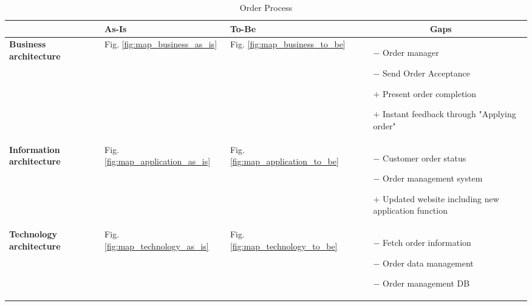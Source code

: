 \begin{table}[H]
	\centering
	\begin{tabular}{|p{2.4cm}|l|l|p{7.5cm}|}
		\hline
		\textbf{} & \textbf{As-Is} & \textbf{To-Be} & \multicolumn{1}{c|}{\textbf{Gaps}} \\ \hline
		\textbf{Business architecture} & Fig. \ref{fig:map_business_as_is} & Fig. \ref{fig:map_business_to_be} & \begin{itemize}\vspace{-0.5cm}
		\item[$-$] Order manager
		\item[$-$] Send Order Acceptance
		\item[$+$] Present order completion
		\item[$+$] Instant feedback through "Applying order"
		\end{itemize}\vspace{-0.7cm} \\ \hline 

		\textbf{Information architecture} &Fig. \ref{fig:map_application_as_is}  & Fig. \ref{fig:map_application_to_be}  & \begin{itemize}\vspace{-0.5cm}
		\item[$-$] Customer order status
		\item[$-$] Order management system
		\item[$+$] Updated website including new application function
		\end{itemize}\vspace{-0.7cm} \\ \hline

		\textbf{Technology architecture} &Fig. \ref{fig:map_technology_as_is}  &Fig. \ref{fig:map_technology_to_be}  & \begin{itemize}\vspace{-0.5cm}
		\item[$-$] Fetch order information
		\item[$-$] Order data management
		\item[$-$] Order management DB
		\end{itemize}\vspace{-0.7cm} \\ \hline
	\end{tabular}	
	\caption{Order Process}
	\label{table:gaps_order}
\end{table}

